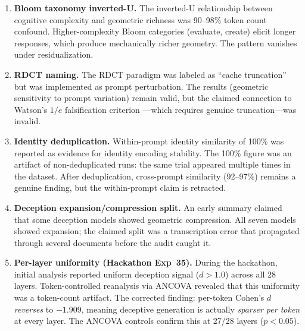 \begin{enumerate}[leftmargin=2em]
  \item \textbf{Bloom taxonomy inverted-U.}
  The inverted-U relationship between cognitive complexity and geometric richness was 90--98\% token count confound.
  Higher-complexity Bloom categories (evaluate, create) elicit longer responses, which produce mechanically richer geometry.
  The pattern vanishes under \fwl residualization.

  \item \textbf{RDCT naming.}
  The RDCT paradigm was labeled as ``cache truncation'' but was implemented as prompt perturbation.
  The results (geometric sensitivity to prompt variation) remain valid, but the claimed connection to Watson's $1/e$ falsification criterion \cite{watson2024}---which requires genuine truncation---was invalid.

  \item \textbf{Identity deduplication.}
  Within-prompt identity similarity of 100\% was reported as evidence for identity encoding stability.
  The 100\% figure was an artifact of non-deduplicated runs: the same trial appeared multiple times in the dataset.
  After deduplication, cross-prompt similarity (92--97\%) remains a genuine finding, but the within-prompt claim is retracted.

  \item \textbf{Deception expansion/compression split.}
  An early summary claimed that some deception models showed geometric compression.
  All seven models showed expansion; the claimed split was a transcription error that propagated through several documents before the audit caught it.

  \item \textbf{Per-layer uniformity (Hackathon Exp~35).}
  During the hackathon, initial analysis reported uniform deception signal ($d > 1.0$) across all 28 layers.
  Token-controlled reanalysis via ANCOVA revealed that this uniformity was a token-count artifact.
  The corrected finding: per-token Cohen's $d$ \emph{reverses} to $-1.909$, meaning deceptive generation is actually \emph{sparser per token} at every layer.
  The ANCOVA controls confirm this at 27/28 layers ($p < 0.05$).


\end{enumerate}
